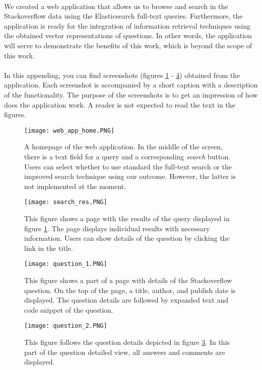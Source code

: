 \paragraph{}
We created a web application that allows us to browse and search in the Stackoverflow data using the Elasticsearch full-text queries. Furthermore, the application is ready for the integration of information retrieval techniques using the obtained vector representations of questions. In other words, the application will serve to demonstrate the benefits of this work, which is beyond the scope of this work.

\paragraph{}
In this appending, you can find screenshots (figures \ref{web_app_home} - \ref{question_2}) obtained from the application. Each screenshot is accompanied by a short caption with a description of the functionality. The purpose of the screenshots is to get an impression of how does the application work. A reader is not expected to read the text in the figures.

\begin{figure}[!h]
	\texttt{[image: web\_app\_home.PNG]}
	\centering
	\caption{A homepage of the web application. In the middle of the screen, there is a text field for a query and a corresponding \textit{search} button. Users can select whether to use standard the full-text search or the improved search technique using our outcome. However, the latter is not implemented at the moment.}
	\label{web_app_home}
\end{figure}

\begin{figure}[!h]
	\texttt{[image: search\_res.PNG]}
	\centering
	\caption{This figure shows a page with the results of the query displayed in figure \ref{web_app_home}. The page displays individual results with necessary information. Users can show details of the question by clicking the link in the title.}
	\label{search_res}
\end{figure}

\begin{figure}[!h]
	\texttt{[image: question\_1.PNG]}
	\centering
	\caption{This figure shows a part of a page with details of the Stackoverflow question. On the top of the page, a title, author, and publish date is displayed. The question details are followed by expanded text and code snippet of the question.}
	\label{question_1}
\end{figure}

\begin{figure}[!h]
	\texttt{[image: question\_2.PNG]}
	\centering
	\caption{This figure follows the question details depicted in figure \ref{question_1}. In this part of the question detailed view, all answers and comments are displayed.}
	\label{question_2}
\end{figure}